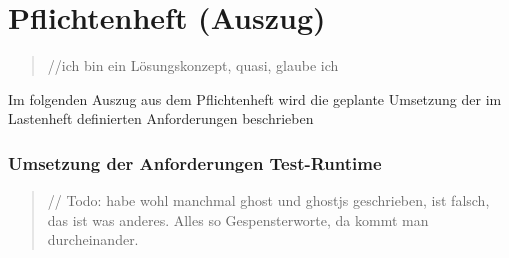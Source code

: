 \section{Pflichtenheft (Auszug)}\label{pflichtenheft-auszug}

\begin{quote}
//ich bin ein Lösungskonzept, quasi, glaube ich
\end{quote}

Im folgenden Auszug aus dem Pflichtenheft wird die geplante Umsetzung
der im Lastenheft definierten Anforderungen beschrieben

\subsubsection{Umsetzung der Anforderungen
Test-Runtime}\label{umsetzung-der-anforderungen-test-runtime}

\begin{quote}
// Todo: habe wohl manchmal ghost und ghostjs geschrieben, ist falsch,
das ist was anderes. Alles so Gespensterworte, da kommt man
durcheinander.
\end{quote}

